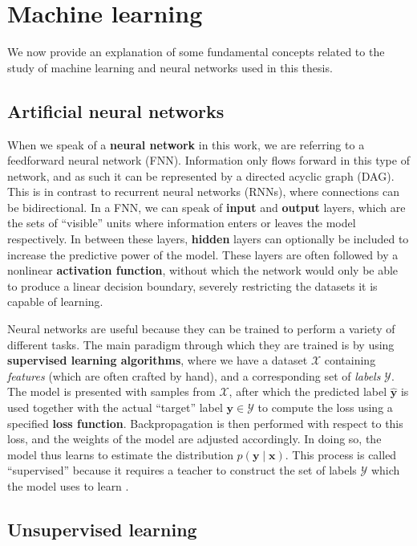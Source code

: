 \documentclass[11pt]{article}
\theoremstyle{remark}
\begin{document}
\section{Machine learning}

We now provide an explanation of some fundamental concepts related to the study of machine learning and neural networks used in this thesis.

\subsection{Artificial neural networks}

When we speak of a \textbf{neural network} in this work, we are referring to a feedforward neural network (FNN). Information only flows forward in this type of network, and as such it can be represented by a directed acyclic graph (DAG). This is in contrast to recurrent neural networks (RNNs), where connections can be bidirectional. In a FNN, we can speak of \textbf{input} and \textbf{output} layers, which are the sets of ``visible'' units where information enters or leaves the model respectively. In between these layers, \textbf{hidden} layers can optionally be included to increase the predictive power of the model. These layers are often followed by a nonlinear \textbf{activation function}, without which the network would only be able to produce a linear decision boundary, severely restricting the datasets it is capable of learning.

Neural networks are useful because they can be trained to perform a variety of different tasks. The main paradigm through which they are trained is by using \textbf{supervised learning algorithms}, where we have a dataset $\mathcal{X}$ containing \textit{features} (which are often crafted by hand), and a corresponding set of \textit{labels} $\mathcal{Y}$. The model is presented with samples from $\mathcal{X}$, after which the predicted label $\bm{\hat{y}}$ is used together with the actual ``target'' label $\bm{y} \in \mathcal{Y}$ to compute the loss using a specified \textbf{loss function}. Backpropagation is then performed with respect to this loss, and the weights of the model are adjusted accordingly. In doing so, the model thus learns to estimate the distribution $p(\bm{y} \mid \bm{x})$. This process is called ``supervised'' because it requires a teacher to construct the set of labels $\mathcal{Y}$ which the model uses to learn \cite{Goodfellow-et-al-2016}.

\subsection{Unsupervised learning}
\end{document}
